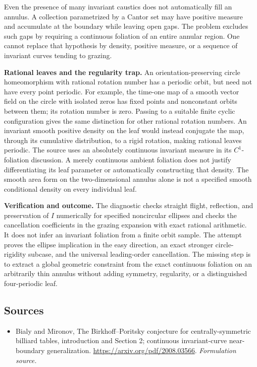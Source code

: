 \documentclass[11pt]{article}
\begin{document}
Even the presence of many invariant caustics does not automatically fill an
annulus.  A collection parametrized by a Cantor set may have positive measure
and accumulate at the boundary while leaving open gaps.  The problem excludes
such gaps by requiring a continuous foliation of an entire annular region.
One cannot replace that hypothesis by density, positive measure, or a sequence
of invariant curves tending to grazing.

\textbf{Rational leaves and the regularity trap.}
An orientation-preserving circle homeomorphism with rational rotation number
has a periodic orbit, but need not have every point periodic.  For example,
the time-one map of a smooth vector field on the circle with isolated zeros
has fixed points and nonconstant orbits between them; its rotation number is
zero.  Passing to a suitable finite cyclic configuration gives the same
distinction for other rational rotation numbers.
An invariant smooth positive density on the leaf would instead conjugate the
map, through its cumulative distribution, to a rigid rotation, making rational
leaves periodic.  The source uses an absolutely continuous invariant measure
in its $C^1$-foliation discussion.  A merely continuous ambient foliation does
not justify differentiating its leaf parameter or automatically constructing
that density.  The smooth area form on the two-dimensional annulus alone is
not a specified smooth conditional density on every individual leaf.

\textbf{Verification and outcome.}
The diagnostic checks straight flight, reflection, and preservation of $I$
numerically for specified noncircular ellipses and checks the cancellation
coefficients in the grazing expansion with exact rational arithmetic.
It does not infer an invariant foliation from a finite orbit sample.  The
attempt proves the ellipse implication in the easy direction, an exact
stronger circle-rigidity subcase, and the universal leading-order cancellation.
The missing step is to extract a global geometric constraint from the exact
continuous foliation on an arbitrarily thin annulus without adding symmetry,
regularity, or a distinguished four-periodic leaf.
\subsection{Sources}
\begin{itemize}
\item[S1]Bialy and Mironov, The Birkhoff–Poritsky conjecture for centrally-symmetric billiard tables, introduction and Section 2; continuous invariant-curve near-boundary generalization.
\url{https://arxiv.org/pdf/2008.03566}.
\textit{Formulation source.}
\end{itemize}
\end{document}
